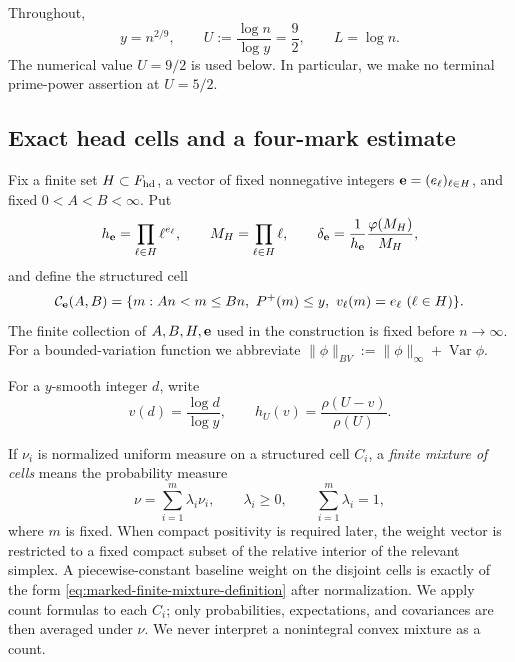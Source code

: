 \documentclass[11pt]{article}
\numberwithin{equation}{section}
\theoremstyle{definition}
\theoremstyle{remark}
\newcommand{\1}{\mathbf 1}
\begin{document}
Throughout,
\begin{equation}
 y=n^{2/9},\qquad U:=\frac{\log n}{\log y}=\frac92,
 \qquad L=\log n.
 \label{eq:marked-parameters}
\end{equation}
The numerical value \(U=9/2\) is used below.  In particular, we make no
terminal prime-power assertion at \(U=5/2\).

\subsection{Exact head cells and a four-mark estimate}
\label{subsec:marked-structured-cells}

Fix a finite set \(H\subset F_{\rm hd}\), a vector of fixed nonnegative
integers \({\bf e}=(e_\ell)_{\ell\in H}\), and fixed
\(0<A<B<\infty\).  Put
\begin{equation}
 h_{\bf e}=\prod_{\ell\in H}\ell^{e_\ell},\qquad
 M_H=\prod_{\ell\in H}\ell,\qquad
 \delta_{\bf e}=\frac1{h_{\bf e}}
                    \frac{\varphi(M_H)}{M_H},
 \label{eq:marked-head-density}
\end{equation}
and define the structured cell
\begin{equation}
 \mathcal C_{\bf e}(A,B)=
 \{m:An<m\le Bn,\ P^+(m)\le y,\
                         v_\ell(m)=e_\ell\ (\ell\in H)\}.
 \label{eq:marked-structured-cell}
\end{equation}
The finite collection of \(A,B,H,{\bf e}\) used in the construction is
fixed before \(n\to\infty\).
For a bounded-variation function we abbreviate
\(\|\phi\|_{BV}:=\|\phi\|_\infty+\operatorname{Var}\phi\).

For a \(y\)-smooth integer \(d\), write
\[
 v(d)=\frac{\log d}{\log y},\qquad
 h_U(v)=\frac{\rho(U-v)}{\rho(U)}.
\]

If \(\nu_i\) is normalized uniform measure on a structured cell
\(C_i\), a \emph{finite mixture of cells} means the probability measure
\begin{equation}
                  \nu=\sum_{i=1}^m\lambda_i\nu_i,
 \qquad \lambda_i\geq0,\qquad \sum_{i=1}^m\lambda_i=1,
 \label{eq:marked-finite-mixture-definition}
\end{equation}
where \(m\) is fixed.  When compact positivity is required later, the
weight vector is restricted to a fixed compact subset of the relative
interior of the relevant simplex.  A piecewise-constant baseline weight
on the disjoint cells is exactly of the form
\eqref{eq:marked-finite-mixture-definition} after normalization.  We
apply count formulas to each \(C_i\); only probabilities, expectations,
and covariances are then averaged under \(\nu\).  We never interpret a
nonintegral convex mixture as a count.
\end{document}
